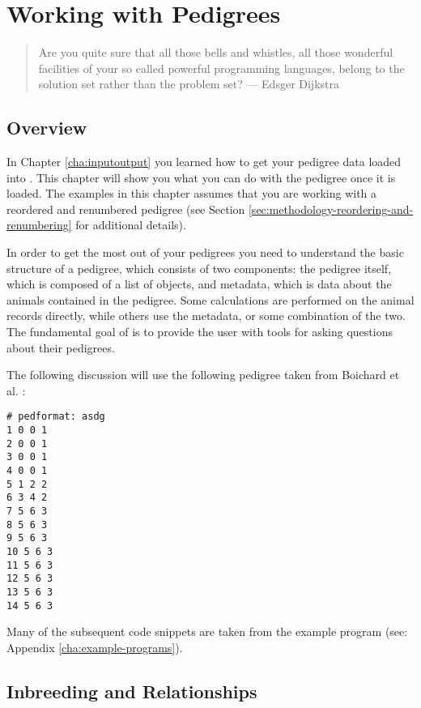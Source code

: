 \chapter{Working with Pedigrees}
\label{cha:computing}
\begin{quote}
 Are you quite sure that all those bells and whistles, all those wonderful facilities of your so called powerful programming languages, belong to the solution set rather than the problem set? --- Edsger Dijkstra
\end{quote}
\section{Overview}\label{sec:computing-overview}
In Chapter \ref{cha:inputoutput} you learned how to get your pedigree data loaded into \PyPedal{}. This chapter will show you what you can do with the pedigree once it is loaded. The examples in this chapter assumes that you are working with a reordered and renumbered pedigree (see Section \ref{sec:methodology-reordering-and-renumbering} for additional details).

In order to get the most out of your pedigrees you need to understand the basic structure of a \PyPedal{} pedigree, which consists of two components: the pedigree itself, which is composed of a list of  objects, and metadata, which is data about the animals contained in the pedigree. Some calculations are performed on the animal records directly, while others use the metadata, or some combination of the two. The fundamental goal of \PyPedal{} is to provide the user with tools for asking questions about their pedigrees.

The following discussion will use the following pedigree taken from Boichard et al. \citeyear{ref352}:
\begin{verbatim}
# pedformat: asdg
1 0 0 1
2 0 0 1
3 0 0 1
4 0 0 1
5 1 2 2
6 3 4 2
7 5 6 3
8 5 6 3
9 5 6 3
10 5 6 3
11 5 6 3
12 5 6 3
13 5 6 3
14 5 6 3
\end{verbatim}
Many of the subsequent code snippets are taken from the  example program (see: Appendix \ref{cha:example-programs}). 

\section{Inbreeding and Relationships}\label{sec:computing-inbreeding}

